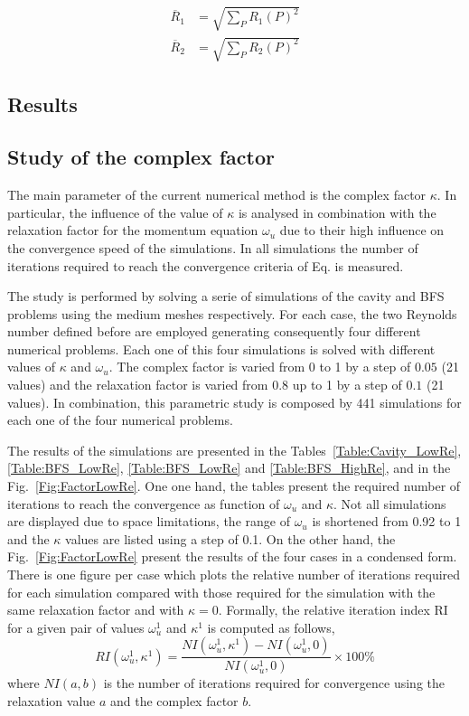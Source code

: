 \documentclass[final,3p,times,10pt,onecolumn]{myElsarticle}
\numberwithin{equation}{section}
\begin{document}
\begin{align}
\overline{R}_1
&=
\sqrt
{
\sum_P
R_1(P)^2
}
\\
\overline{R}_2
&=
\sqrt
{
\sum_P
R_2(P)^2
}
\end{align}


  

\subsection{Results}

\subsection{Study of the complex factor}
The main parameter of the current numerical method is the complex factor $\kappa$. In particular, the influence of the value of $\kappa$ is analysed in combination with the relaxation factor for the momentum equation $\omega_{u}$ due to their high influence on the convergence speed of the simulations.  In all simulations the number of iterations required to reach the convergence criteria of Eq. is measured.

The study is performed by solving a serie of simulations of the cavity and BFS problems using the medium meshes respectively. For each case, the two Reynolds number defined before are employed generating consequently four different numerical problems.
Each one of this four simulations is solved with different values of $\kappa$ and $\omega_{u}$. The complex factor is varied from 0 to 1 by a step of $0.05$ (21 values) and the relaxation factor is varied from 0.8 up to 1 by a step of $0.1$ (21 values). In combination, this parametric study is composed by 441 simulations for each one of the four numerical problems.

The results of the simulations are presented in the Tables~\ref{Table:Cavity_LowRe}, \ref{Table:BFS_LowRe}, \ref{Table:BFS_LowRe} and \ref{Table:BFS_HighRe}, and in the Fig.~\ref{Fig:FactorLowRe}. One one hand, the tables present the required number of iterations to reach the convergence as function of $\omega_u$ and $\kappa$. Not all simulations are displayed due to space limitations, the range of $\omega_u$ is shortened from 0.92 to 1 and the $\kappa$ values are listed using a step of 0.1. On the other hand, the Fig.~\ref{Fig:FactorLowRe} present the results of the four cases in a condensed form. There is one figure per case which plots the relative number of iterations required for each simulation compared with those required for the simulation with the same relaxation factor and with $\kappa = 0$. Formally, the relative iteration index RI for a given pair of values $\omega_u^1$ and $\kappa^1$ is computed as follows,
\begin{equation}
RI(\omega_u^1, \kappa^1)
=
\dfrac
{
NI(\omega_u^1, \kappa^1) - NI(\omega_u^1, 0)
}
{
NI(\omega_u^1, 0)
}
\times
100 \%
\end{equation}
where $NI(a,b)$ is the number of iterations required for convergence using the relaxation value $a$ and the complex factor $b$.
\end{document}
